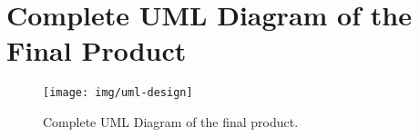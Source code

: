 \chapter{Complete UML Diagram of the Final Product}
\label{cha:uml-diagram}

\begin{figure}[h]
  \centering
  \texttt{[image: img/uml-design]}
  \caption{Complete UML Diagram of the final product.}
  \label{fig:uml-design}
\end{figure}
